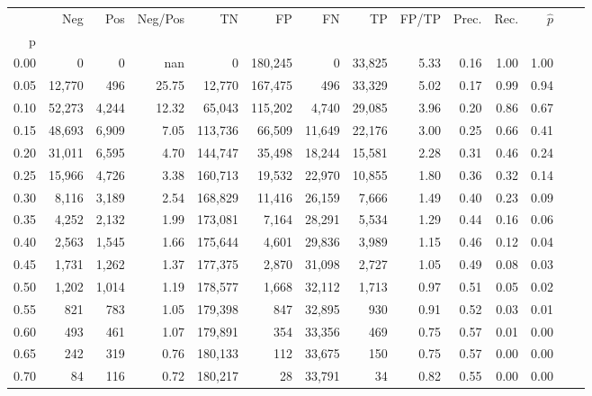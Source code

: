 \begin{tabular}{rrrrrrrrrrrrrr}
\toprule
{} &     Neg &    Pos & Neg/Pos &       TN &       FP &      FN &      TP & FP/TP & Prec. &  Rec. & $\hat{p}$ \\
p    &         &        &         &          &          &         &         &       &       &       &           \\
\midrule
0.00 &       0 &      0 &     nan &        0 &  180,245 &       0 &  33,825 &  5.33 &  0.16 &  1.00 &      1.00 \\
0.05 &  12,770 &    496 &   25.75 &   12,770 &  167,475 &     496 &  33,329 &  5.02 &  0.17 &  0.99 &      0.94 \\
0.10 &  52,273 &  4,244 &   12.32 &   65,043 &  115,202 &   4,740 &  29,085 &  3.96 &  0.20 &  0.86 &      0.67 \\
0.15 &  48,693 &  6,909 &    7.05 &  113,736 &   66,509 &  11,649 &  22,176 &  3.00 &  0.25 &  0.66 &      0.41 \\
0.20 &  31,011 &  6,595 &    4.70 &  144,747 &   35,498 &  18,244 &  15,581 &  2.28 &  0.31 &  0.46 &      0.24 \\
0.25 &  15,966 &  4,726 &    3.38 &  160,713 &   19,532 &  22,970 &  10,855 &  1.80 &  0.36 &  0.32 &      0.14 \\
0.30 &   8,116 &  3,189 &    2.54 &  168,829 &   11,416 &  26,159 &   7,666 &  1.49 &  0.40 &  0.23 &      0.09 \\
0.35 &   4,252 &  2,132 &    1.99 &  173,081 &    7,164 &  28,291 &   5,534 &  1.29 &  0.44 &  0.16 &      0.06 \\
0.40 &   2,563 &  1,545 &    1.66 &  175,644 &    4,601 &  29,836 &   3,989 &  1.15 &  0.46 &  0.12 &      0.04 \\
0.45 &   1,731 &  1,262 &    1.37 &  177,375 &    2,870 &  31,098 &   2,727 &  1.05 &  0.49 &  0.08 &      0.03 \\
0.50 &   1,202 &  1,014 &    1.19 &  178,577 &    1,668 &  32,112 &   1,713 &  0.97 &  0.51 &  0.05 &      0.02 \\
0.55 &     821 &    783 &    1.05 &  179,398 &      847 &  32,895 &     930 &  0.91 &  0.52 &  0.03 &      0.01 \\
0.60 &     493 &    461 &    1.07 &  179,891 &      354 &  33,356 &     469 &  0.75 &  0.57 &  0.01 &      0.00 \\
0.65 &     242 &    319 &    0.76 &  180,133 &      112 &  33,675 &     150 &  0.75 &  0.57 &  0.00 &      0.00 \\
0.70 &      84 &    116 &    0.72 &  180,217 &       28 &  33,791 &      34 &  0.82 &  0.55 &  0.00 &      0.00 \\

\end{tabular}
